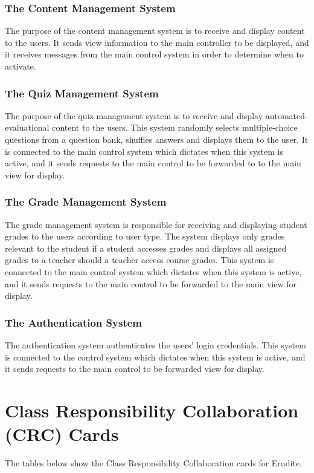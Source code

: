 \documentclass[]{article}
\begin{document}
\subsubsection{The Content Management System}
The purpose of the content management system is to receive and display content to the users. It sends view information to the main controller to be displayed, and it receives messages from the main control system in order to determine when to activate. 

\subsubsection{The Quiz Management System}
The purpose of the quiz management system is to receive and display 
automated-evaluational content to the users. This system randomly selects 
multiple-choice questions from a question bank, shuffles answers and displays 
them to the user. It is connected to the main control system which dictates when this 
system is active, and it sends requests to the main control to be forwarded to 
 to the main view for display.

\subsubsection{The Grade Management System}
The grade management system is responsible for receiving and displaying student 
grades to the users according to user type. The system displays only grades 
relevant to the student if a student accesses grades and displays all assigned 
grades to a teacher should a teacher access course grades. This system is 
connected to the main control system which dictates when this system is active, and 
it sends requests to the main control to be forwarded to the main view for display.

\subsubsection{The Authentication System}
The authentication system authenticates the users' login credentials. This system is 
connected to the control system which dictates when this system is active, and 
it sends requests to the main control to be forwarded view for display.



\section{Class Responsibility Collaboration (CRC) Cards}
\label{sec:class_responsibility_collaboration_crc_cards}
The tables below show the Class Responsibility Collaboration cards for Erudite.
	
\end{document}
